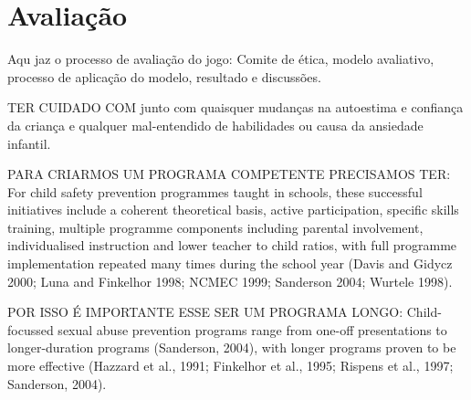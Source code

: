 \chapter{Avaliação}\label{ch:Avaliacao}

Aqu jaz o processo de avaliação do jogo:
Comite de ética, modelo avaliativo, processo de aplicação do modelo, resultado e discussões. 


TER CUIDADO COM junto com quaisquer mudanças na autoestima e confiança da criança e qualquer mal-entendido de habilidades ou causa da ansiedade infantil.


PARA CRIARMOS UM PROGRAMA COMPETENTE PRECISAMOS TER: For child safety prevention programmes taught in schools, these successful initiatives include a coherent theoretical basis, active participation, specific skills training, multiple programme components including parental involvement, individualised instruction and lower teacher to child ratios, with full programme implementation repeated many times during the school year (Davis and Gidycz 2000; Luna and Finkelhor 1998; NCMEC 1999; Sanderson 2004; Wurtele 1998).

POR ISSO É IMPORTANTE ESSE SER UM PROGRAMA LONGO: Child-focussed sexual abuse prevention programs range from one-off presentations to longer-duration programs (Sanderson, 2004), with longer programs proven to be more effective (Hazzard et al., 1991; Finkelhor et al., 1995; Rispens et al., 1997; Sanderson, 2004). %










